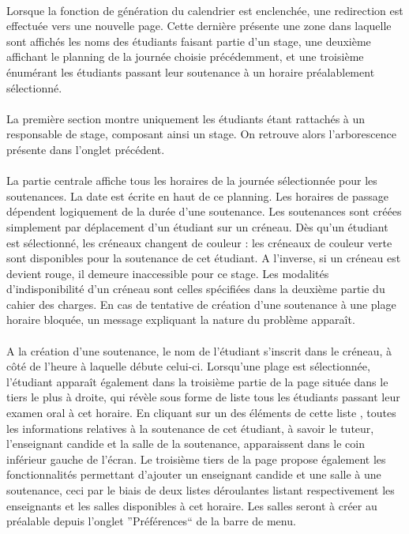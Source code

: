 \documentclass[a4paper,10pt]{report}
\begin{document}
	      \paragraph{}
		Lorsque la fonction de génération du calendrier est enclenchée, une redirection est effectuée vers une nouvelle page.
		Cette dernière présente une zone dans laquelle sont affichés les noms des étudiants faisant partie d'un stage, une deuxième affichant le planning de la journée choisie précédemment, et une troisième énumérant les étudiants passant leur soutenance à un horaire préalablement sélectionné.
		
	      \paragraph{}
		La première section montre uniquement les étudiants étant rattachés à un responsable de stage, composant ainsi un stage.
		On retrouve alors l'arborescence présente dans l'onglet précédent.
		
	      \paragraph{}
		La partie centrale affiche tous les horaires de la journée sélectionnée pour les soutenances.
		La date est écrite en haut de ce planning.
		Les horaires de passage dépendent logiquement de la durée d'une soutenance.
		Les soutenances sont créées simplement par déplacement d'un étudiant sur un créneau.
		Dès qu'un étudiant est sélectionné, les créneaux changent de couleur : les créneaux de couleur verte sont disponibles pour la soutenance de cet étudiant.
		A l'inverse, si un créneau est devient rouge, il demeure inaccessible pour ce stage.
		Les modalités d'indisponibilité d'un créneau sont celles spécifiées dans la deuxième partie du cahier des charges.
		En cas de tentative de création d'une soutenance à une plage horaire bloquée, un message expliquant la nature du problème apparaît.
		
	      \paragraph{}
		A la création d'une soutenance, le nom de l'étudiant s'inscrit dans le créneau, à côté de l'heure à laquelle débute celui-ci.
		Lorsqu'une plage est sélectionnée, l'étudiant apparaît également dans la troisième partie de la page située dans le tiers le plus à droite, qui révèle sous forme de liste tous les étudiants passant leur examen oral à cet horaire.
		En cliquant sur un des éléments de cette liste , toutes les informations relatives à la soutenance de cet étudiant, à savoir le tuteur, l'enseignant candide et la salle de la soutenance, apparaissent dans le coin inférieur gauche de l'écran.
		Le troisième tiers de la page propose également les fonctionnalités permettant d'ajouter un enseignant candide et une salle à une soutenance, ceci par le biais de deux listes déroulantes listant respectivement les enseignants et les salles disponibles à cet horaire.
		Les salles seront à créer au préalable depuis l'onglet ''Préférences`` de la barre de menu.
		
\end{document}
